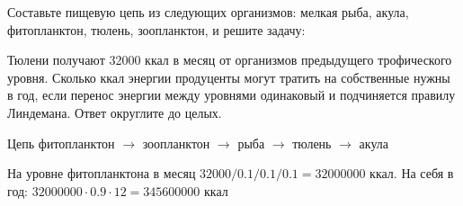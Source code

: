 
Составьте
пищевую цепь из следующих организмов: мелкая рыба, акула, фитопланктон, тюлень,
зоопланктон, и решите задачу:

Тюлени
получают 32000 ккал в месяц от организмов предыдущего трофического уровня.
Сколько ккал энергии продуценты могут тратить на собственные нужны в год, если
перенос энергии между уровнями одинаковый и подчиняется правилу Линдемана.
Ответ округлите до целых.

\solutionSection

Цепь фитопланктон $\rightarrow$ зоопланктон $\rightarrow$ рыба $\rightarrow$ тюлень $\rightarrow$ акула

На уровне фитопланктона в месяц $32000/0.1/0.1/0.1=32000000$ ккал. 
На себя в год: $32000000 \cdot 0.9 \cdot 12=345 600 000$ ккал

